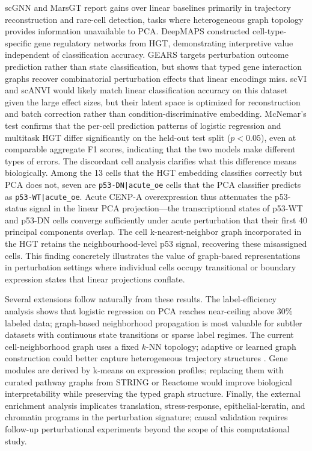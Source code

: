 scGNN \citep{wang2021scgnn} and MarsGT \citep{wu2024marsgt} report gains over
linear baselines primarily in trajectory reconstruction and rare-cell detection,
tasks where heterogeneous graph topology provides information unavailable to PCA.
DeepMAPS \citep{ma2023deepmaps} constructed cell-type-specific gene regulatory
networks from HGT, demonstrating interpretive value independent of classification
accuracy.
GEARS \citep{roohani2023gears} targets perturbation outcome prediction rather than
state classification, but shows that typed gene interaction graphs recover
combinatorial perturbation effects that linear encodings miss.
scVI and scANVI \citep{lopez2018scvi} would likely match linear classification
accuracy on this dataset given the large effect sizes, but their latent space
is optimized for reconstruction and batch correction rather than
condition-discriminative embedding.
McNemar's test confirms that the per-cell prediction patterns of logistic
regression and multitask HGT differ significantly on the held-out test split
($p<0.05$), even at comparable aggregate F1 scores, indicating that the two
models make different types of errors.
The discordant cell analysis clarifies what this difference means biologically.
Among the 13 cells that the HGT embedding classifies correctly but PCA does not,
seven are \texttt{p53-DN|acute\_oe} cells that the PCA classifier predicts as
\texttt{p53-WT|acute\_oe}.
Acute CENP-A overexpression thus attenuates the p53-status signal in the linear
PCA projection---the transcriptional states of p53-WT and p53-DN cells converge
sufficiently under acute perturbation that their first 40 principal components
overlap.
The cell k-nearest-neighbor graph incorporated in the HGT retains the
neighbourhood-level p53 signal, recovering these misassigned cells.
This finding concretely illustrates the value of graph-based representations in
perturbation settings where individual cells occupy transitional or boundary
expression states that linear projections conflate.

Several extensions follow naturally from these results.
The label-efficiency analysis shows that logistic regression on PCA reaches
near-ceiling above 30\% labeled data; graph-based neighborhood propagation
is most valuable for subtler datasets with continuous state transitions or
sparse label regimes.
The current cell-neighborhood graph uses a fixed $k$-NN topology; adaptive or
learned graph construction could better capture heterogeneous trajectory
structures \citep{wang2021scgnn}.
Gene modules are derived by k-means on expression profiles; replacing them with
curated pathway graphs from STRING or Reactome would improve biological
interpretability while preserving the typed graph structure.
Finally, the external enrichment analysis implicates translation, stress-response,
epithelial-keratin, and chromatin programs in the perturbation signature;
causal validation requires follow-up perturbational experiments beyond the
scope of this computational study.
